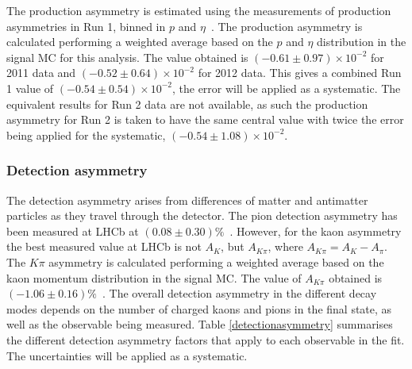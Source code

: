 The \Bpm production asymmetry is estimated using the measurements of production asymmetries in Run 1, binned in $p$ and $\eta$~\cite{LHCb-PAPER-2016-054}. The production asymmetry is calculated performing a weighted average based on the $p$ and $\eta$ distribution in the signal MC for this analysis. The value obtained is $(-0.61 \pm 0.97) \times 10^{-2}$ for 2011 data and $(-0.52 \pm 0.64) \times 10^{-2}$ for 2012 data. This gives a combined Run 1 value of $(-0.54 \pm 0.54) \times 10^{-2}$, the error will be applied as a systematic. The equivalent results for Run 2 data are not available, as such the production asymmetry for Run 2 is taken to have the same central value with twice the error being applied for the systematic, $(-0.54 \pm 1.08) \times 10^{-2}$.

\subsubsection{Detection asymmetry}

The detection asymmetry arises from differences of matter and antimatter particles as they travel through the detector. The pion detection asymmetry has been measured at LHCb at $(0.08 \pm 0.30)\%$~\cite{pi_det_asym}. However, for the kaon asymmetry the best measured value at LHCb is not $A_K$, but $A_{K\pi}$, where $A_{K\pi} = A_K - A_{\pi}$. The $K\pi$ asymmetry is calculated performing a weighted average based on the kaon momentum distribution in the signal MC. The value of $A_{K\pi}$ obtained is $(-1.06 \pm 0.16)\%$~\cite{k_det_asym}. The overall detection asymmetry in the different decay modes depends on the number of charged kaons and pions in the final state, as well as the \CP observable being measured. Table \ref{detectionasymmetry} summarises the different detection asymmetry factors that apply to each observable in the fit. The uncertainties will be applied as a systematic.

